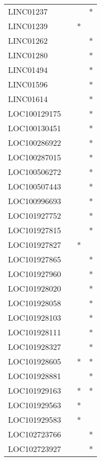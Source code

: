 \begin{longtable}{lccc}
LINC01237      &           &     &       * \\
LINC01239      &           &   * &         \\
LINC01262      &           &     &       * \\
LINC01280      &           &     &       * \\
LINC01494      &           &     &       * \\
LINC01596      &           &     &       * \\
LINC01614      &           &     &       * \\
LOC100129175   &           &     &       * \\
LOC100130451   &           &     &       * \\
LOC100286922   &           &     &       * \\
LOC100287015   &           &     &       * \\
LOC100506272   &           &     &       * \\
LOC100507443   &           &     &       * \\
LOC100996693   &           &     &       * \\
LOC101927752   &           &     &       * \\
LOC101927815   &           &     &       * \\
LOC101927827   &           &   * &         \\
LOC101927865   &           &     &       * \\
LOC101927960   &           &     &       * \\
LOC101928020   &           &     &       * \\
LOC101928058   &           &     &       * \\
LOC101928103   &           &     &       * \\
LOC101928111   &           &     &       * \\
LOC101928327   &           &     &       * \\
LOC101928605   &           &   * &       * \\
LOC101928881   &           &     &       * \\
LOC101929163   &           &   * &       * \\
LOC101929563   &           &   * &         \\
LOC101929583   &           &   * &         \\
LOC102723766   &           &     &       * \\
LOC102723927   &           &     &       * \\

\end{longtable}
